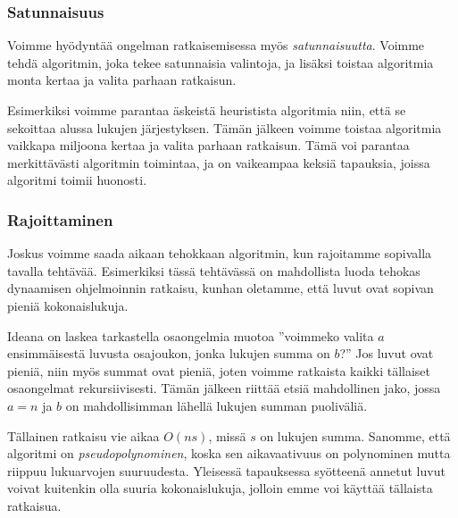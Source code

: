 \subsubsection{Satunnaisuus}


Voimme hyödyntää ongelman ratkaisemisessa myös
\emph{satunnaisuutta}.
Voimme tehdä algoritmin, joka tekee satunnaisia valintoja,
ja lisäksi toistaa algoritmia monta kertaa ja valita
parhaan ratkaisun.

Esimerkiksi voimme parantaa äskeistä heuristista algoritmia niin,
että se sekoittaa alussa lukujen järjestyksen. Tämän jälkeen voimme toistaa
algoritmia vaikkapa miljoona kertaa ja valita parhaan ratkaisun.
Tämä voi parantaa merkittävästi algoritmin toimintaa, ja on
vaikeampaa keksiä tapauksia, joissa algoritmi toimii huonosti.

\subsubsection{Rajoittaminen}


Joskus voimme saada aikaan tehokkaan algoritmin,
kun rajoitamme sopivalla tavalla tehtävää.
Esimerkiksi tässä tehtävässä on mahdollista luoda
tehokas dynaamisen ohjelmoinnin ratkaisu,
kunhan oletamme, että luvut ovat sopivan pieniä kokonaislukuja.

Ideana on laskea tarkastella osaongelmia muotoa
''voimmeko valita $a$ ensimmäisestä luvusta osajoukon,
jonka lukujen summa on $b$?''
Jos luvut ovat pieniä, niin myös summat ovat pieniä,
joten voimme ratkaista kaikki tällaiset osaongelmat rekursiivisesti.
Tämän jälkeen riittää etsiä mahdollinen jako, jossa $a=n$
ja $b$ on mahdollisimman lähellä lukujen summan puoliväliä.

Tällainen ratkaisu vie aikaa $O(ns)$, missä $s$ on lukujen summa.
Sanomme, että algoritmi on \emph{pseudopolynominen},
koska sen aikavaativuus on polynominen mutta riippuu lukuarvojen suuruudesta.
Yleisessä tapauksessa syötteenä annetut luvut voivat
kuitenkin olla suuria kokonaislukuja,
jolloin emme voi käyttää tällaista ratkaisua.
